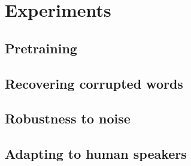\section{Experiments}

\subsection{Pretraining}

\subsection{Recovering corrupted words}

\subsection{Robustness to noise}

\subsection{Adapting to human speakers}